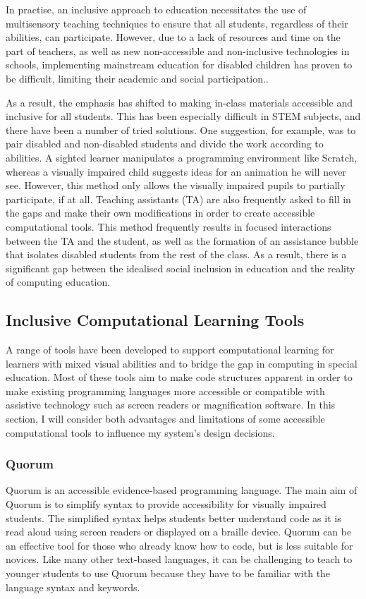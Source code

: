 \documentclass[oneside,%
                    author={Malak Hajji},
                    degree={BSc},
                    title={Designing An Accessible Computational Toolkit For Students},
                  subtitle={With Mixed Visual Abilities}]{dissertation}
\begin{document}
In practise, an inclusive approach to education necessitates the use of multisensory teaching techniques to ensure that all students, regardless of their abilities, can participate. However, due to a lack of resources and time on the part of teachers, as well as new non-accessible and non-inclusive technologies in schools, implementing mainstream education for disabled children has proven to be difficult, limiting their academic and social participation.\cite{gray}. 

As a result, the emphasis has shifted to making in-class materials accessible and inclusive for all students. This has been especially difficult in STEM subjects\cite{moon}, and there have been a number of tried solutions. One suggestion, for example, was to pair disabled and non-disabled students and divide the work according to abilities. A sighted learner manipulates a programming environment like Scratch, whereas a visually impaired child suggests ideas for an animation he will never see. However, this method only allows the visually impaired pupils to partially participate, if at all. Teaching assistants (TA) are also frequently asked to fill in the gaps and make their own modifications in order to create accessible computational tools. This method frequently results in focused interactions between the TA and the student, as well as the formation of an assistance bubble that isolates disabled students from the rest of the class\cite{metatla}. As a result, there is a significant gap between the idealised social inclusion in education and the reality of computing education.

\subsection{Inclusive Computational Learning Tools}

A range of tools have been developed to support computational learning for learners with mixed visual abilities and to bridge the gap in computing in special education. Most of these tools aim to make code structures apparent in order to make existing programming languages more accessible or compatible with assistive technology such as screen readers or magnification software. In this section, I will consider both advantages and limitations of some accessible computational tools to influence my system’s design decisions. 

\subsubsection{Quorum}
Quorum \cite{quorum}is an accessible evidence-based programming language. The main aim of Quorum is to simplify syntax to provide accessibility for visually impaired students. The simplified syntax helps students better understand code as it is read aloud using screen readers or displayed on a braille device. Quorum can be an effective tool for those who already know how to code, but is less suitable for novices. Like many other text-based languages, it can be challenging to teach to younger students to use Quorum because they have to be familiar with the language syntax and keywords.
\end{document}
